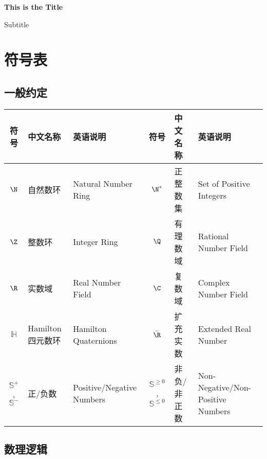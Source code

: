 \documentclass[UTF8]{ctexart}
\begin{document}
    \begin{center}
        {\LARGE\textbf{This is the Title}}

        Subtitle
    \end{center}

    \setcounter{section}{-1}
    \section{符号表}

        \setcounter{subsection}{-1}
        \subsection{一般约定}
        
            \begin{center}
                \small
                \begin{tabular}{|c|l|l||c|l|l|}
                    \hline
                    符号 & 中文名称 & 英语说明 & 符号 & 中文名称 & 英语说明\\
                    \hline\hline
                    $\N$ & 自然数环 & Natural Number Ring & $\N^*$ & 正整数集 & Set of Positive Integers\\
                    \hline
                    $\Z$ & 整数环 & Integer Ring & $\Q$ & 有理数域 & Rational Number Field\\
                    \hline
                    $\R$ & 实数域 & Real Number Field & $\C$ & 复数域 & Complex Number Field\\
                    \hline
                    $\mathbb{H}$ & Hamilton 四元数环 & Hamilton Quaternions & $\bar{\R}$ & 扩充实数 & Extended Real Number\\
                    \hline
                    $\mathbb{S}^+$, $\mathbb{S}^-$ & 正/负数 & Positive/Negative Numbers & $\mathbb{S}^{\geq 0}$, $\mathbb{S}^{\leq 0}$ & 非负/非正数 & Non-Negative/Non-Positive Numbers\\
                    \hline
                \end{tabular}
            \end{center}

        \subsection{数理逻辑}
        
\end{document}
